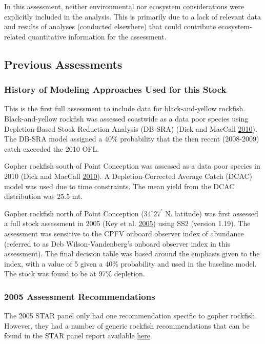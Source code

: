 \documentclass[12pt,]{article}
\begin{document}
In this assessment, neither environmental nor ecosystem considerations
were explicitly included in the analysis. This is primarily due to a
lack of relevant data and results of analyses (conducted elsewhere) that
could contribute ecosystem-related quantitative information for the
assessment.

\subsection{Previous Assessments}\label{previous-assessments}

\subsubsection{History of Modeling Approaches Used for this
Stock}\label{history-of-modeling-approaches-used-for-this-stock}

This is the first full assessment to include data for black-and-yellow
rockfish. Black-and-yellow rockfish was assessed coastwide as a data
poor species using Depletion-Based Stock Reduction Analysis (DB-SRA)
(Dick and MacCall \protect\hyperlink{ref-Dick2010}{2010}). The DB-SRA
model assigned a 40\% probability that the then recent (2008-2009) catch
exceeded the 2010 OFL.

Gopher rockfish south of Point Conception was assessed as a data poor
species in 2010 (Dick and MacCall
\protect\hyperlink{ref-Dick2010}{2010}). A Depletion-Corrected Average
Catch (DCAC) model was used due to time constraints. The mean yield from
the DCAC distribution was 25.5 mt.

Gopher rockfish north of Point Conception (\(34^\circ 27^\prime\) N.
latitude) was first assessed a full stock assessment in 2005 (Key et al.
\protect\hyperlink{ref-Key2005}{2005}) using SS2 (version 1.19). The
assessment was sensitive to the CPFV onboard observer index of abundance
(referred to as Deb Wilson-Vandenberg's onboard observer index in this
assessment). The final decision table was based around the emphasis
given to the index, with a value of 5 given a 40\% probability and used
in the baseline model. The stock was found to be at 97\% depletion.

\subsubsection{2005 Assessment
Recommendations}\label{assessment-recommendations}

The 2005 STAR panel only had one recommendation specific to gopher
rockfish. However, they had a number of generic rockfish recommendations
that can be found in the STAR panel report available
\href{https://www.pcouncil.org/groundfish/stock-assessments/by-species/gopher-rockfish/}{here}.
\end{document}
